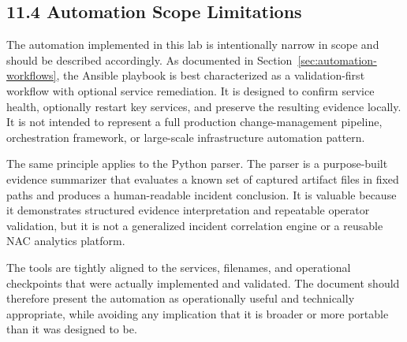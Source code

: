 \documentclass[11pt]{article}
\begin{document}

\subsection{11.4 Automation Scope Limitations}
\label{sec:automation-scope-limitations}

The automation implemented in this lab is intentionally narrow in scope and should be described accordingly. As documented in Section~\ref{sec:automation-workflows}, the Ansible playbook is best characterized as a validation-first workflow with optional service remediation. It is designed to confirm service health, optionally restart key services, and preserve the resulting evidence locally. It is not intended to represent a full production change-management pipeline, orchestration framework, or large-scale infrastructure automation pattern.

The same principle applies to the Python parser. The parser is a purpose-built evidence summarizer that evaluates a known set of captured artifact files in fixed paths and produces a human-readable incident conclusion. It is valuable because it demonstrates structured evidence interpretation and repeatable operator validation, but it is not a generalized incident correlation engine or a reusable NAC analytics platform.

The tools are tightly aligned to the services, filenames, and operational checkpoints that were actually implemented and validated. The document should therefore present the automation as operationally useful and technically appropriate, while avoiding any implication that it is broader or more portable than it was designed to be.

\end{document}
